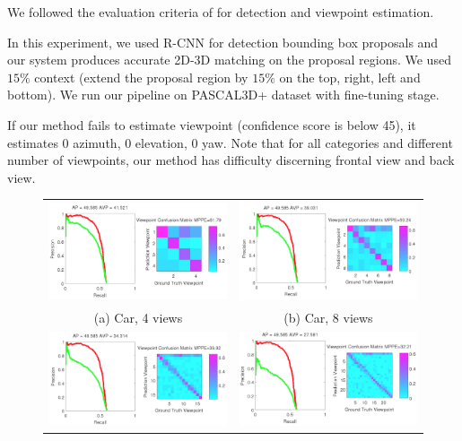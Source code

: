 \documentclass[10pt,twocolumn,letterpaper]{article}
\begin{document}
We followed the evaluation criteria of \cite{Xiang14} for detection and
viewpoint estimation.

In this experiment, we used R-CNN\cite{Girshick14} for detection bounding box
proposals and our system produces accurate 2D-3D matching on the proposal
regions. We used $15\%$ context (extend the proposal region by $15\%$ on the
top, right, left and bottom). We run our pipeline on PASCAL3D+
dataset\cite{Xiang14} with fine-tuning stage. 

If our method fails to estimate viewpoint (confidence score is below 45), it
estimates 0 azimuth, 0 elevation, 0 yaw. Note that for all categories and
different number of viewpoints, our method has difficulty discerning frontal
view and back view.


\begin{figure}[h]
  \centering
  \begin{tabular}{cc}
  \includegraphics[width=0.45\linewidth]{car_cnn4_crop.png}&
  \includegraphics[width=0.45\linewidth]{car_cnn8_crop.png}\\
    (a) Car, 4 views&
    (b) Car, 8 views\\
  \includegraphics[width=0.45\linewidth]{car_cnn16_crop.png}&
  \includegraphics[width=0.45\linewidth]{car_cnn24_crop.png}\\

\end{tabular}
\end{figure}
\end{document}
